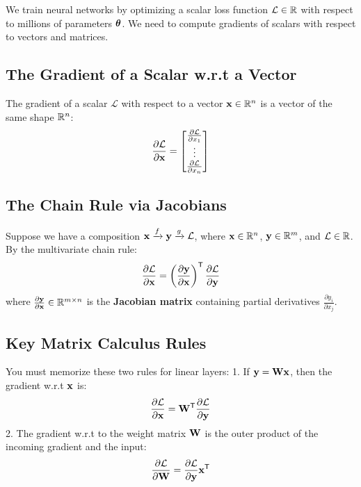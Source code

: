 We train neural networks by optimizing a scalar loss function $\mathcal{L} \in \mathbb{R}$ with respect to millions of parameters $\boldsymbol{\theta}$. We need to compute gradients of scalars with respect to vectors and matrices.

\subsection{The Gradient of a Scalar w.r.t a Vector}
The gradient of a scalar $\mathcal{L}$ with respect to a vector $\mathbf{x} \in \mathbb{R}^n$ is a vector of the same shape $\mathbb{R}^n$:
\begin{equation}
\frac{\partial \mathcal{L}}{\partial \mathbf{x}} = \begin{bmatrix}
\frac{\partial \mathcal{L}}{\partial x_1} \\
\vdots \\
\frac{\partial \mathcal{L}}{\partial x_n}
\end{bmatrix}
\end{equation}

\subsection{The Chain Rule via Jacobians}
Suppose we have a composition $\mathbf{x} \xrightarrow{f} \mathbf{y} \xrightarrow{g} \mathcal{L}$, where $\mathbf{x} \in \mathbb{R}^n$, $\mathbf{y} \in \mathbb{R}^m$, and $\mathcal{L} \in \mathbb{R}$.
By the multivariate chain rule:
\begin{equation}
\frac{\partial \mathcal{L}}{\partial \mathbf{x}} = \left( \frac{\partial \mathbf{y}}{\partial \mathbf{x}} \right)^{\mathsf{T}} \frac{\partial \mathcal{L}}{\partial \mathbf{y}}
\end{equation}
where $\frac{\partial \mathbf{y}}{\partial \mathbf{x}} \in \mathbb{R}^{m \times n}$ is the \textbf{Jacobian matrix} containing partial derivatives $\frac{\partial y_i}{\partial x_j}$.

\subsection{Key Matrix Calculus Rules}
You must memorize these two rules for linear layers:
1. If $\mathbf{y} = \mathbf{W} \mathbf{x}$, then the gradient w.r.t $\mathbf{x}$ is:
\begin{equation}
\frac{\partial \mathcal{L}}{\partial \mathbf{x}} = \mathbf{W}^{\mathsf{T}} \frac{\partial \mathcal{L}}{\partial \mathbf{y}}
\end{equation}
2. The gradient w.r.t to the weight matrix $\mathbf{W}$ is the outer product of the incoming gradient and the input:
\begin{equation}
\frac{\partial \mathcal{L}}{\partial \mathbf{W}} = \frac{\partial \mathcal{L}}{\partial \mathbf{y}} \mathbf{x}^{\mathsf{T}}
\end{equation}

